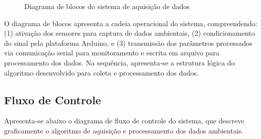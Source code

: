 \documentclass[12pt, a4paper]{article}
\begin{document}
\begin{figure}[h]
    \centering
    \caption{Diagrama de blocos do sistema de aquisição de dados}
    \label{fig:diagrama_blocos}
\end{figure}

O diagrama de blocos apresenta a cadeia operacional do sistema, compreendendo: (1) ativação dos sensores  para captura
de dados ambientais, (2) condicionamento do sinal pela plataforma Arduino, e (3) transmissão dos parâmetros processados
via comunicação serial para monitoramento e escrita em arquivo para processamento dos dados. Na sequência, apresenta-se a estrutura lógica do algoritmo desenvolvido para
coleta e processamento dos dados.

\subsection{Fluxo de Controle}
Apresenta-se abaixo o diagrama de fluxo de controle do sistema, que descreve graficamente o algoritmo de aquisição e processamento dos dados ambientais.
\end{document}
